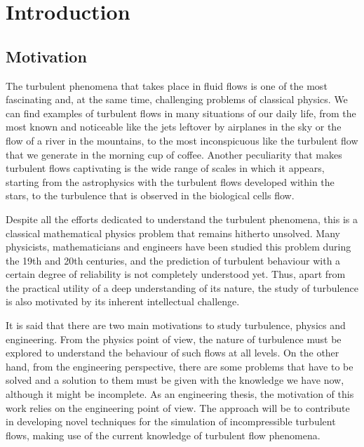 
\chapter{Introduction}
\label{chap-Introduction}

\section{Motivation}

The turbulent phenomena that takes place in fluid flows is one of the most fascinating and, at the same time, challenging problems of classical physics. We can find examples of turbulent flows in many situations of our daily life, from the most known and noticeable like the jets leftover by airplanes in the sky or the flow of a river in the mountains, to the most inconspicuous like the turbulent flow that we generate in the morning cup of coffee. Another peculiarity that makes turbulent flows captivating is the wide range of scales in which it appears, starting from the astrophysics with the turbulent flows developed within the stars, to the turbulence that is observed in the biological cells flow.

Despite all the efforts dedicated to understand the turbulent phenomena, this is a classical mathematical physics problem that remains hitherto unsolved. Many physicists, mathematicians and engineers have been studied this problem during the 19th and 20th centuries, and the prediction of turbulent behaviour with a certain degree of reliability is not completely understood yet. Thus, apart from the practical utility of a deep understanding of its nature, the study of turbulence is also motivated by its inherent intellectual challenge.

It is said that there are two main motivations to study turbulence, physics and engineering. From the physics point of view, the nature of turbulence must be explored to understand the behaviour of such flows at all levels. On the other hand, from the engineering perspective, there are some problems that have to be solved and a solution to them must be given with the knowledge we have now, although it might be incomplete. As an engineering thesis, the motivation of this work relies on the engineering point of view. The approach will be to contribute in developing novel techniques for the simulation of incompressible turbulent flows, making use of the current knowledge of turbulent flow phenomena.

